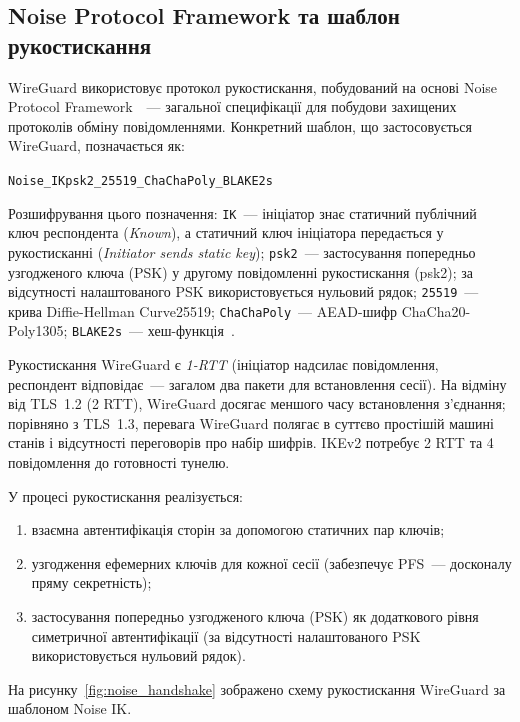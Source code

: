\subsection{Noise Protocol Framework та шаблон рукостискання}

WireGuard використовує протокол рукостискання, побудований на основі
Noise Protocol Framework~\cite{perrin2018noise}~--- загальної специфікації для
побудови захищених протоколів обміну повідомленнями. Конкретний шаблон, що
застосовується WireGuard, позначається як:

\begin{center}
\texttt{Noise\_IKpsk2\_25519\_ChaChaPoly\_BLAKE2s}
\end{center}

Розшифрування цього позначення: \texttt{IK}~--- ініціатор знає статичний
публічний ключ респондента (\textit{Known}), а статичний ключ ініціатора
передається у рукостисканні (\textit{Initiator sends static key});
\texttt{psk2}~--- застосування попередньо узгодженого ключа (PSK) у другому
повідомленні рукостискання (psk2); за відсутності налаштованого PSK використовується
нульовий рядок; \texttt{25519}~--- крива Diffie-Hellman Curve25519;
\texttt{ChaChaPoly}~--- AEAD-шифр ChaCha20-Poly1305; \texttt{BLAKE2s}~--- хеш-функція~\cite{dowling2018provable}.

Рукостискання WireGuard є \textit{1-RTT} (ініціатор надсилає повідомлення,
респондент відповідає~--- загалом два пакети для встановлення сесії). На відміну від TLS~1.2 (2 RTT), WireGuard
досягає меншого часу встановлення з'єднання; порівняно з TLS~1.3, перевага
WireGuard полягає в суттєво простішій машині станів і відсутності переговорів
про набір шифрів. IKEv2 потребує 2 RTT та 4 повідомлення до готовності тунелю.

У процесі рукостискання реалізується:
\begin{enumerate}
  \item взаємна автентифікація сторін за допомогою статичних пар ключів;
  \item узгодження ефемерних ключів для кожної сесії (забезпечує PFS~---
        досконалу пряму секретність);
  \item застосування попередньо узгодженого ключа (PSK) як додаткового рівня
        симетричної автентифікації (за відсутності налаштованого PSK
        використовується нульовий рядок).
\end{enumerate}

На рисунку~\ref{fig:noise_handshake} зображено схему рукостискання WireGuard
за шаблоном Noise IK.

